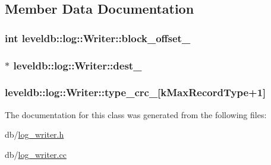 \subsection{Member Data Documentation}
\hypertarget{classleveldb_1_1log_1_1_writer_acf53922c11753a1b22add27ca588b885}{
\subsubsection[{block\-\_\-offset\-\_\-}]{\setlength{\rightskip}{0pt plus 5cm}int leveldb\-::log\-::\-Writer\-::block\-\_\-offset\-\_\-\hspace{0.3cm}{\ttfamily [private]}}}\label{classleveldb_1_1log_1_1_writer_acf53922c11753a1b22add27ca588b885}
\hypertarget{classleveldb_1_1log_1_1_writer_ac72f17a670167f08a8b87d6ffe205f46}{
\subsubsection[{dest\-\_\-}]{$\ast$ leveldb\-::log\-::\-Writer\-::dest\-\_\-\hspace{0.3cm}{\ttfamily [private]}}}\label{classleveldb_1_1log_1_1_writer_ac72f17a670167f08a8b87d6ffe205f46}
\hypertarget{classleveldb_1_1log_1_1_writer_a0e09a993f3d477abe96288297e8094b1}{
\subsubsection[{type\-\_\-crc\-\_\-}]{ leveldb\-::log\-::\-Writer\-::type\-\_\-crc\-\_\-\mbox{[}{\bf k\-Max\-Record\-Type}+1\mbox{]}\hspace{0.3cm}{\ttfamily [private]}}}\label{classleveldb_1_1log_1_1_writer_a0e09a993f3d477abe96288297e8094b1}


The documentation for this class was generated from the following files\-:\begin{DoxyCompactItemize}
\item 
db/\hyperlink{log__writer_8h}{log\-\_\-writer.\-h}\item 
db/\hyperlink{log__writer_8cc}{log\-\_\-writer.\-cc}\end{DoxyCompactItemize}
